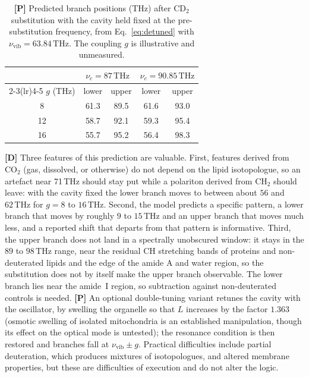 \documentclass[11pt]{article}
\newcommand{\stD}{\textbf{\textcolor{green!40!black}{[D]}}}
\newcommand{\stP}{\textbf{\textcolor{violet!80!black}{[P]}}}
\newcommand{\thz}{\,\mathrm{THz}}
\theoremstyle{plain}
\theoremstyle{definition}
\theoremstyle{remark}
\begin{document}
\begin{table}[ht]
\centering
\small
\begin{tabular}{@{}ccccc@{}}
\toprule
 & \multicolumn{2}{c}{$\nu_c=87\thz$} & \multicolumn{2}{c}{$\nu_c=90.85\thz$} \\
\cmidrule(lr){2-3}\cmidrule(lr){4-5}
$g$ (THz) & lower & upper & lower & upper \\
\midrule
8 & 61.3 & 89.5 & 61.6 & 93.0 \\
12 & 58.7 & 92.1 & 59.3 & 95.4 \\
16 & 55.7 & 95.2 & 56.4 & 98.3 \\
\bottomrule
\end{tabular}
\caption{\stP{} Predicted branch positions (THz) after CD$_2$ substitution with the cavity held fixed at the pre-substitution frequency, from Eq.~\eqref{eq:detuned} with $\nu_{\mathrm{vib}}=63.84\thz$. The coupling $g$ is illustrative and unmeasured.}
\label{tab:isotope}
\end{table}

\stD{} Three features of this prediction are valuable. First, features derived from CO$_2$ (gas, dissolved, or otherwise) do not depend on the lipid isotopologue, so an artefact near 71\,THz should stay put while a polariton derived from CH$_2$ should leave: with the cavity fixed the lower branch moves to between about $56$ and $62\thz$ for $g=8$ to $16\thz$. Second, the model predicts a specific pattern, a lower branch that moves by roughly $9$ to $15\thz$ and an upper branch that moves much less, and a reported shift that departs from that pattern is informative. Third, the upper branch does not land in a spectrally unobscured window: it stays in the $89$ to $98\thz$ range, near the residual CH stretching bands of proteins and non-deuterated lipids and the edge of the amide A and water region, so the substitution does not by itself make the upper branch observable. The lower branch lies near the amide~I region, so subtraction against non-deuterated controls is needed. \stP{} An optional double-tuning variant retunes the cavity with the oscillator, by swelling the organelle so that $L$ increases by the factor $1.363$ (osmotic swelling of isolated mitochondria is an established manipulation, though its effect on the optical mode is untested); the resonance condition is then restored and branches fall at $\nu_{\mathrm{vib}}\pm g$. Practical difficulties include partial deuteration, which produces mixtures of isotopologues, and altered membrane properties, but these are difficulties of execution and do not alter the logic.
\end{document}
